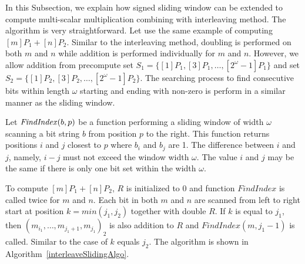 In this Subsection, we explain how signed sliding window can be extended to compute multi-scalar multiplication combining with interleaving method.
The algorithm is very straightforward.  Let use the same example of computing $[m]P_1 + [n]P_2$.
Similar to the interleaving method, doubling is performed on both $m$ and $n$ while addition is performed individually for $m$ and $n$.
However, we allow addition from precompute set $S_1 = \{[1]P_1, [3]P_1, \dots, [2^{\omega}-1]P_1\}$
and set $S_2 = \{[1]P_2, [3]P_2, \dots, [2^{\omega}-1]P_2\}$.
The searching process to find consecutive bits within length $\omega$ starting and ending with non-zero is perform in a similar manner as the sliding window.

Let ${\it{FindIndex}}(b,p)$ be a function performing a sliding window of width $\omega$ scanning a bit string $b$ from position $p$ to the right.
This function returns positions $i$ and $j$ closest to $p$ where $b_i$ and $b_j$ are 1.
The difference between $i$ and $j$, namely, $i-j$ must not exceed the window width $\omega$.
The value $i$ and $j$ may be the same if there is only one bit set within the width $\omega$.

To compute $[m]P_1 + [n]P_2$, $R$ is initialized to $0$ and function $FindIndex$ is called twice for $m$ and $n$.
Each bit in both $m$ and $n$ are scanned from left to right start at position $k = min(j_1,j_2)$ together with double $R$.
If $k$ is equal to $j_1$, then ${(m_{i_1},\dots,m_{{j_1}+1},m_{j_1})}_2$ is also addition to $R$ and $FindIndex(m,j_1-1)$ is called.
Similar to the case of $k$ equals $j_2$.
The algorithm is shown in Algorithm~\ref{interleaveSlidingAlgo}.

